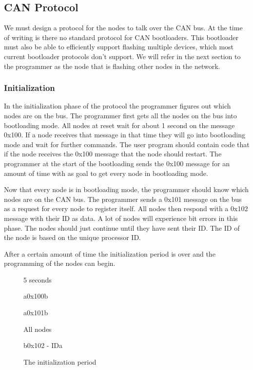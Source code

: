 \documentclass[twocolumn]{article}
\begin{document}
	
	\subsection*{CAN Protocol}
		We must design a protocol for the nodes to talk over the CAN bus.
		At the time of writing is there no standard protocol for CAN bootloaders.
		This bootloader must also be able to efficiently support flashing multiple devices,
		which most current bootloader protocols don't support.
		We will refer in the next section to the programmer as the node that is flashing other nodes in the network.
			
		\subsubsection*{Initialization}
			In the initialization phase of the protocol the programmer figures out which nodes are on the bus.
			The programmer first gets all the nodes on the bus into bootloading mode.
			All nodes at reset wait for about 1 second on the message 0x100.
			If a node receives that message in that time they will go into bootloading mode and wait for further commands.
			The user program should contain code that if the node receives the 0x100 message that the node should restart.
			The programmer at the start of the bootloading sends the 0x100 message for an amount of time with as goal to get every node in bootloading mode.
			
			Now that every node is in bootloading mode, the programmer should know which nodes are on the CAN bus.
			The programmer sends a 0x101 message on the bus as a request for every node to register itself.
			All nodes then respond with a 0x102 message with their ID as data.
			A lot of nodes will experience bit errors in this phase.
			The nodes should just continue until they have sent their ID.
			The ID of the node is based on the unique processor ID.
			
			After a certain amount of time the initialization period is over and the programming of the nodes can begin.
		
			\begin{figure}[t]
				\centering
				\begin{sequencediagram}
				
					\begin{sdloop}{5 seconds}
						\begin{call}{a}{0x100}{b}{}
						\end{call}
					\end{sdloop}
				
					\begin{call}{a}{0x101}{b}{}
						\begin{sdloop}{All nodes}
							\begin{call}{b}{0x102 - ID}{a}{}
							\end{call}
						\end{sdloop}
					\end{call}
				\end{sequencediagram}
				\caption{The initialization period}
			\end{figure}
		
\end{document}
